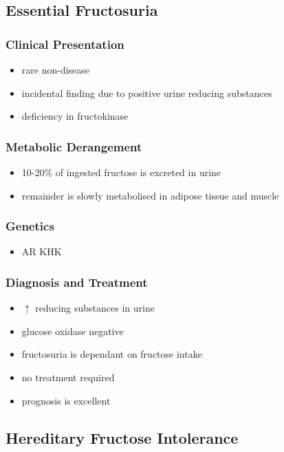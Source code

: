 \documentclass{scrartcl}
\begin{document}
\subsection{Essential Fructosuria}
\label{sec:org739f899}
\subsubsection{Clinical Presentation}
\label{sec:orgf819883}
\begin{itemize}
\item rare non-disease
\item incidental finding due to positive urine reducing substances
\item deficiency in fructokinase
\end{itemize}
\subsubsection{Metabolic Derangement}
\label{sec:org0ed659f}
\begin{itemize}
\item 10-20\% of ingested fructose is excreted in urine
\item remainder is slowly metabolised in adipose tissue and muscle
\end{itemize}
\subsubsection{Genetics}
\label{sec:orgf255aaf}
\begin{itemize}
\item AR KHK
\end{itemize}
\subsubsection{Diagnosis and Treatment}
\label{sec:org7857ebc}
\begin{itemize}
\item \(\uparrow\) reducing substances in urine
\item glucose oxidase negative
\item fructosuria is dependant on fructose intake
\item no treatment required
\item prognosis is excellent
\end{itemize}

\subsection{Hereditary Fructose Intolerance}
\label{sec:org601b3b6}
\end{document}
